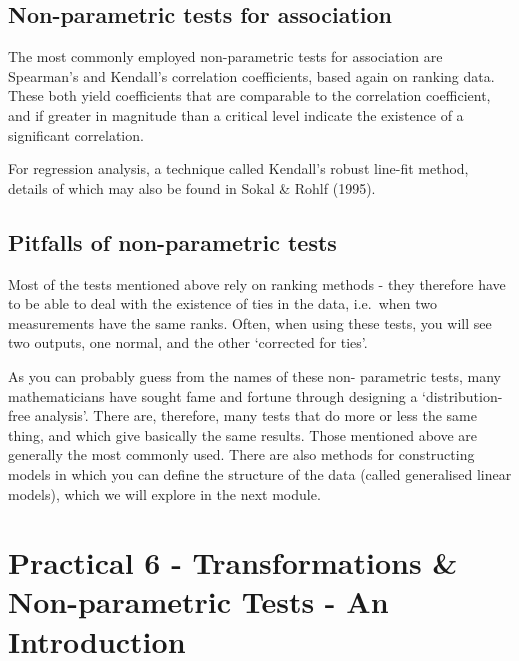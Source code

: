 \documentclass[
]{book}
\begin{document}
\subsection*{Non-parametric tests for association}\label{non-parametric-tests-for-association}

The most commonly employed non-parametric tests for association are Spearman's and Kendall's correlation coefficients, based again on ranking data. These both yield coefficients that are comparable to the correlation coefficient, and if greater in magnitude than a critical level indicate the existence of a significant correlation.

For regression analysis, a technique called Kendall's robust line-fit method, details of which may also be found in Sokal \& Rohlf (1995).

\subsection*{Pitfalls of non-parametric tests}\label{pitfalls-of-non-parametric-tests}

Most of the tests mentioned above rely on ranking methods - they therefore have to be able to deal with the existence of ties in the data, i.e.~when two measurements have the same ranks. Often, when using these tests, you will see two outputs, one normal, and the other `corrected for ties'.

As you can probably guess from the names of these non- parametric tests, many mathematicians have sought fame and fortune through designing a `distribution-free analysis'. There are, therefore, many tests that do more or less the same thing, and which give basically the same results. Those mentioned above are generally the most commonly used. There are also methods for constructing models in which you can define the structure of the data (called generalised linear models), which we will explore in the next module.

\section{Practical 6 - Transformations \& Non-parametric Tests - An Introduction}\label{practical-6---transformations-non-parametric-tests---an-introduction}
\end{document}
